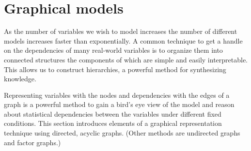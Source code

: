 \newpage
\section{Graphical models}

As the number of variables we wish to model increases the number of different models increases faster than exponentially. A common technique to get a handle on the dependencies of many real-world variables is to organize them into connected structures the components of which are simple and easily interpretable. This allows us to construct hierarchies, a powerful method for synthesizing knowledge.

Representing variables with the nodes and dependencies with the edges of a graph is a powerful method to gain a bird's eye view of the model and reason about statistical dependencies between the variables under different fixed conditions. This section introduces elements of a graphical representation technique using directed, acyclic graphs. (Other methods are undirected graphs and factor graphs.)

